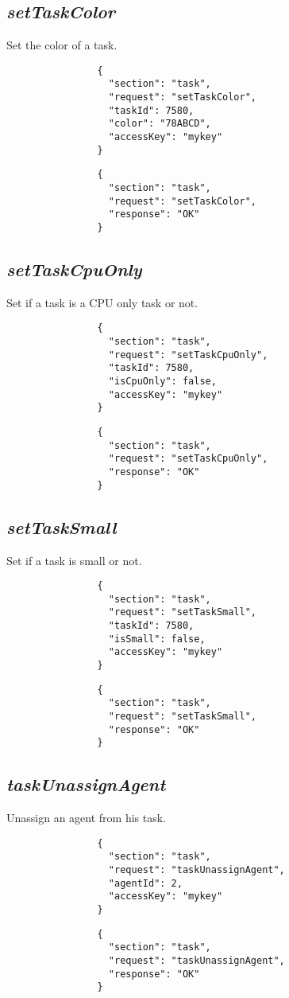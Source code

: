 		\subsection*{\textit{setTaskColor}}
			Set the color of a task.
			{
				\color{blue}
				\begin{verbatim}
				{
				  "section": "task",
				  "request": "setTaskColor",
				  "taskId": 7580,
				  "color": "78ABCD",
				  "accessKey": "mykey"
				}
				\end{verbatim}
			}
			{
				\color{OliveGreen}
				\begin{verbatim}
				{
				  "section": "task",
				  "request": "setTaskColor",
				  "response": "OK"
				}
				\end{verbatim}
			}
		\subsection*{\textit{setTaskCpuOnly}}
			Set if a task is a CPU only task or not.
			{
				\color{blue}
				\begin{verbatim}
				{
				  "section": "task",
				  "request": "setTaskCpuOnly",
				  "taskId": 7580,
				  "isCpuOnly": false,
				  "accessKey": "mykey"
				}
				\end{verbatim}
			}
			{
				\color{OliveGreen}
				\begin{verbatim}
				{
				  "section": "task",
				  "request": "setTaskCpuOnly",
				  "response": "OK"
				}
				\end{verbatim}
			}
		\subsection*{\textit{setTaskSmall}}
			Set if a task is small or not.
			{
				\color{blue}
				\begin{verbatim}
				{
				  "section": "task",
				  "request": "setTaskSmall",
				  "taskId": 7580,
				  "isSmall": false,
				  "accessKey": "mykey"
				}
				\end{verbatim}
			}
			{
				\color{OliveGreen}
				\begin{verbatim}
				{
				  "section": "task",
				  "request": "setTaskSmall",
				  "response": "OK"
				}
				\end{verbatim}
			}
		\subsection*{\textit{taskUnassignAgent}}
			Unassign an agent from his task.
			{
				\color{blue}
				\begin{verbatim}
				{
				  "section": "task",
				  "request": "taskUnassignAgent",
				  "agentId": 2,
				  "accessKey": "mykey"
				}
				\end{verbatim}
			}
			{
				\color{OliveGreen}
				\begin{verbatim}
				{
				  "section": "task",
				  "request": "taskUnassignAgent",
				  "response": "OK"
				}
				\end{verbatim}
			}
